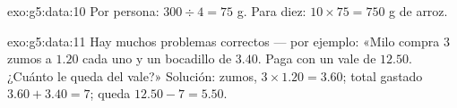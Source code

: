 \begin{solution}{exo:g5:data:10}
Por persona: $300 \div 4 = 75$ g. Para diez:
$10 \times 75 = 750$ g de arroz.
\end{solution}

\begin{solution}{exo:g5:data:11}
Hay muchos problemas correctos --- por ejemplo: «Milo compra $3$ zumos a
$1.20$ cada uno y un bocadillo de $3.40$. Paga con un vale de
$12.50$. ¿Cuánto le queda del vale?» Solución: zumos,
$3 \times 1.20 = 3.60$; total gastado $3.60 + 3.40 = 7$; queda
$12.50 - 7 = 5.50$.
\end{solution}
